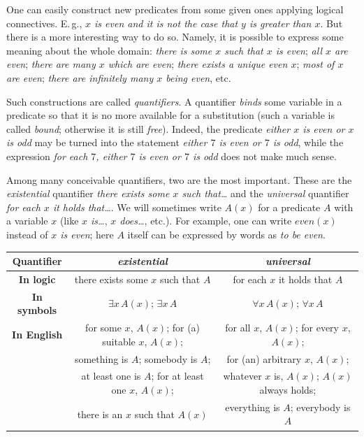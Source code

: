 \documentclass[12pt,notitlepage]{article}
\theoremstyle{plain}
\theoremstyle{definition}
\theoremstyle{plain}
\newcommand{\1}{\mathbf{1}}
\newcommand{\0}{\mathbf{0}}
\newcommand{\mcomm}[1]{}
\begin{document}
\mcomm{The exact nature of domains is out of the discussion scope here, but it might be noteworthy that two arguments of one predicate may have distinct domains in general.}

One can easily construct new predicates from some given ones applying logical connectives. E.\,g., \emph{$x$ is even and it is not the case that $y$ is greater than $x$}. But there is a more interesting way to do so. Namely, it is possible to express some meaning about the whole domain: \emph{there is some $x$ such that $x$ is even}; \emph{all $x$ are even}; \emph{there are many $x$ which are even}; \emph{there exists a unique even $x$}; \emph{most of $x$ are even}; \emph{there are infinitely many $x$ being even}, etc.

Such constructions are called \emph{quantifiers}. A quantifier \emph{binds} some variable in a predicate so that it is no more available for a substitution (such a variable is called \emph{bound}; otherwise it is still \emph{free}). Indeed, the predicate \emph{either $x$ is even or $x$ is odd} may be turned into the statement \emph{either $7$ is even or $7$ is odd}, while the expression \emph{for each $7$, either $7$ is even or $7$ is odd} does not make much sense.

Among many conceivable quantifiers, two are the most important. These are the \emph{existential} quantifier \emph{there exists some $x$ such that\dots} and the \emph{universal} quantifier \emph{for each $x$ it holds that\dots}. We will sometimes write $A(x)$ for a predicate $A$ with a variable $x$ (like \emph{$x$ is\dots}, \emph{$x$ does\dots}, etc.). For example, one can write $even(x)$ instead of \emph{$x$ is even}; here $A$ itself can be expressed by words as \emph{to be even}.

\begin{center}
\begin{tabular}{|c | c | c |}
\hline
\bf Quantifier & \it existential & \it universal \\
\hline
\bf In logic & there exists some $x$ such that $A$  & for each $x$ it holds that $A$ \\
\hline
\bf In symbols & $\exists x\, A(x)$; $\exists x\, A$   & $\forall x\, A(x)$; $\forall x\, A$ \\
\hline
\bf In English & for some $x$, $A(x)$; for (a) suitable $x$, $A(x)$;   & for all $x$, $A(x)$; 
for every $x$, $A(x)$; \\
& something is $A$; somebody is $A$; &  for (an) arbitrary $x$, $A(x)$; \\
& at least one is $A$; for at least one $x$, $A(x)$;  & whatever $x$ is, $A(x)$; $A(x)$ always holds;  \\
& there is an $x$ such that $A(x)$ & everything is $A$; everybody is $A$  \\
\hline
\end{tabular}
\end{center}
\mcomm{As in the above, it is very useful to have some exercises in translating (standard) natural language expressions with quantifiers into symbols, and vice versa. Even the simplest patterns like \emph{all $A$'s are $B$'s}, \emph{no $A$ is $B$}, \emph{some $A$'s are $B$'s} may prove difficult for the students.}
\end{document}
